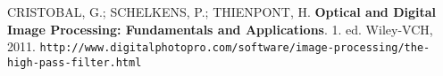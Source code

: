 \documentclass[10pt,a4paper]{article}
\begin{document}
\begin{thebibliography}{99}
     CRISTOBAL, G.; SCHELKENS, P.; THIENPONT, H. \textbf{Optical and Digital Image Processing: Fundamentals and Applications}. 1. ed. Wiley-VCH, 2011.
     \texttt{http://www.digitalphotopro.com/software/image-processing/the-high-pass-filter.html}
\end{thebibliography}
\end{document}
